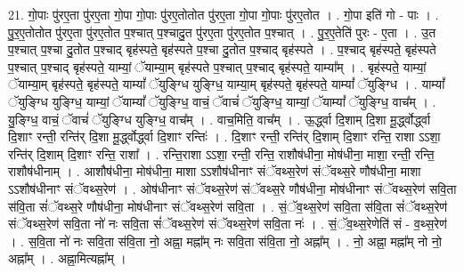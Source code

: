 \documentclass[17pt]{extarticle}
\begin{document}
21. गो॒पाः पु॑र‌ए॒ता पु॑र‌ए॒ता गो॒पा गो॒पाः पु॑र‌ए॒तोतोत पु॑र‌ए॒ता गो॒पा गो॒पाः पु॑र‌ए॒तोत । . गो॒पा इति॑ गो - पाः । . पु॒र॒‌ए॒तोतोत पु॑र‌ए॒ता पु॑र‌ए॒तोत प॒श्चात् प॒श्चादु॒त पु॑र‌ए॒ता पु॑र‌ए॒तोत प॒श्चात् । . पु॒र॒‌ए॒तेति॑ पुरः - ए॒ता । . उ॒त प॒श्चात् प॒श्चा दु॒तोत प॒श्चाद् बृह॑स्पते॒ बृह॑स्पते प॒श्चा दु॒तोत प॒श्चाद् बृह॑स्पते । . प॒श्चाद् बृह॑स्पते॒ बृह॑स्पते प॒श्चात् प॒श्चाद् बृह॑स्पते॒ याम्यां॒ ॅयाम्या॒म् बृह॑स्पते प॒श्चात् 
प॒श्चाद् बृह॑स्पते॒ याम्या᳚म् । . बृह॑स्पते॒ याम्यां॒ ॅयाम्या॒म् बृह॑स्पते॒ बृह॑स्पते॒ याम्यां᳚ ॅयुङ्ग्धि युङ्ग्धि॒ याम्या॒म् बृह॑स्पते॒ बृह॑स्पते॒ याम्यां᳚ ॅयुङ्ग्धि । . याम्यां᳚ ॅयुङ्ग्धि युङ्ग्धि॒ याम्यां॒ ॅयाम्यां᳚ ॅयुङ्ग्धि॒ वाचं॒ ॅवाचं॑ ॅयुङ्ग्धि॒ याम्यां॒ ॅयाम्यां᳚ ॅयुङ्ग्धि॒ वाच᳚म् । . यु॒ङ्ग्धि॒ वाचं॒ ॅवाचं॑ ॅयुङ्ग्धि युङ्ग्धि॒ वाच᳚म् । . वाच॒मिति॒ वाच᳚म् । . ऊ॒र्द्ध्वा दि॒शाम् दि॒शा मू॒र्द्ध्वोर्द्ध्वा दि॒शाꣳ रन्ती॒ रन्ति॑र् दि॒शा मू॒र्द्ध्वोर्द्ध्वा दि॒शाꣳ रन्तिः॑ । . दि॒शाꣳ रन्ती॒ रन्ति॑र् दि॒शाम् दि॒शाꣳ रन्ति॒ राशा ऽऽशा॒ रन्ति॑र् दि॒शाम् दि॒शाꣳ रन्ति॒ राशा᳚ । . रन्ति॒राशा ऽऽशा॒ रन्ती॒ रन्ति॒ राशौष॑धीना॒ मोष॑धीना॒ माशा॒ रन्ती॒ रन्ति॒ राशौष॑धीनाम् । . आशौष॑धीना॒ मोष॑धीना॒ माशा ऽऽशौष॑धीनाꣳ संॅवथ्स॒रेण॑ संॅवथ्स॒रे णौष॑धीना॒ माशा ऽऽशौष॑धीनाꣳ संॅवथ्स॒रेण॑ । . ओष॑धीनाꣳ संॅवथ्स॒रेण॑ संॅवथ्स॒रे णौष॑धीना॒ मोष॑धीनाꣳ संॅवथ्स॒रेण॑ सवि॒ता स॑वि॒ता सं॑ॅवथ्स॒रे णौष॑धीना॒ मोष॑धीनाꣳ संॅवथ्स॒रेण॑ सवि॒ता । . सं॒ॅव॒थ्स॒रेण॑ सवि॒ता स॑वि॒ता सं॑ॅवथ्स॒रेण॑ संॅवथ्स॒रेण॑ सवि॒ता नो॑ नः सवि॒ता सं॑ॅवथ्स॒रेण॑ संॅवथ्स॒रेण॑ सवि॒ता नः॑ । . सं॒ॅव॒थ्स॒रेणेति॑ सं - व॒थ्स॒रेण॑ । . स॒वि॒ता नो॑ नः सवि॒ता स॑वि॒ता नो॒ अह्ना॒ मह्ना᳚म् नः सवि॒ता स॑वि॒ता नो॒ अह्ना᳚म् । . नो॒ अह्ना॒ मह्ना᳚म् नो नो॒ अह्ना᳚म् । . अह्ना॒मित्यह्ना᳚म् । \newline
\end{document}
